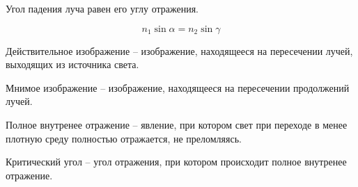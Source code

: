 \documentclass[12pt]{article}
\begin{document}
\begin{center}
\end{center}
\begin{postulate}
    Угол падения луча равен его углу отражения.
\end{postulate}
\begin{postulate}
    $$n_1\sin\alpha=n_2\sin\gamma$$
\end{postulate}
\begin{definition}
    Действительное изображение -- изображение, находящееся на пересечении лучей, выходящих из источника света.
\end{definition}
\begin{definition}
    Мнимое изображение -- изображение, находящееся на пересечении продолжений лучей.
\end{definition}
\begin{definition}
    Полное внутренее отражение -- явление, при котором свет при переходе в менее плотную среду полностью отражается, не преломляясь. 
\end{definition}
\begin{definition}
    Критический угол -- угол отражения, при котором происходит полное внутренее отражение.
\end{definition}
\end{document}
